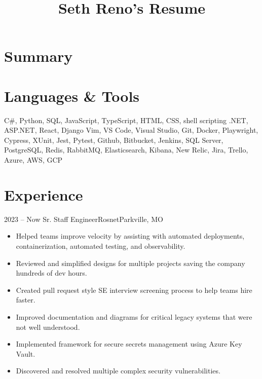 \documentclass[11pt,letterpaper,final]{moderncv}
\title{Seth Reno's Resume}
\begin{document}
\maketitle
\section{Summary}

\section{Languages \& Tools} 
		{C\#, Python, SQL, JavaScript, TypeScript, HTML, CSS, shell scripting}
\linebreak
		{.NET, ASP.NET, React, Django}
\linebreak
		{ Vim, VS Code, Visual Studio, Git, Docker,
			Playwright, Cypress,
			XUnit, Jest, Pytest,
			Github, Bitbucket, Jenkins,
			SQL Server, PostgreSQL, Redis, RabbitMQ,
			Elasticsearch, Kibana, New Relic,
			Jira, Trello,
			Azure, AWS, GCP
		}

\section{Experience} 
	\cventry
{2023 -- Now } {Sr. Staff Engineer}{Rosnet}{Parkville, MO}{}{
		\begin{itemize}
			\item
				Helped teams improve velocity by assisting with automated
				deployments, containerization, automated testing, and
				observability.
			\item
				Reviewed and simplified designs for multiple projects saving the
				company hundreds of dev hours.
			\item
				Created pull request style SE interview screening process to
				help teams hire faster.
			\item
				Improved documentation and diagrams for critical legacy systems
				that were not well understood.
			\item
				Implemented framework for secure secrets management using Azure
				Key Vault.
			\item
				Discovered and resolved multiple complex security
				vulnerabilities.
		\end{itemize}
}
\linebreak
\end{document}
